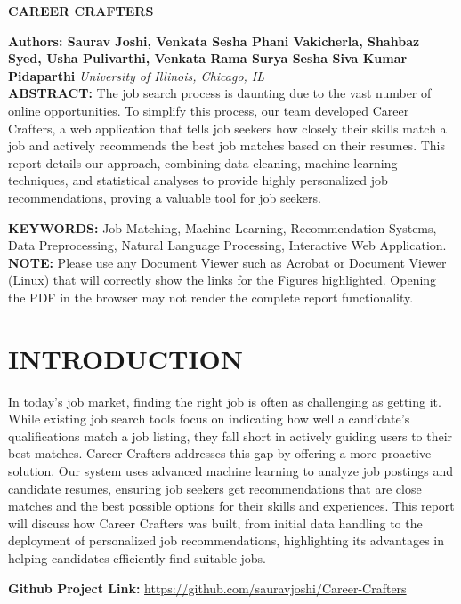 \documentclass[a4paper,10pt]{article}
\begin{document}
\noindent 
\begin{center}
\textbf{{\Large CAREER CRAFTERS}} \\
\end{center}

\noindent 
\textbf{Authors: Saurav Joshi, Venkata Sesha Phani Vakicherla, Shahbaz Syed, Usha Pulivarthi, Venkata Rama Surya Sesha Siva Kumar Pidaparthi} \textit{University of Illinois, Chicago, IL}
\\

\noindent 
\textbf{ABSTRACT: } The job search process is daunting due to the vast number of online opportunities. To simplify this process, our team developed Career Crafters, a web application that tells job seekers how closely their skills match a job and actively recommends the best job matches based on their resumes. This report details our approach, combining data cleaning, machine learning techniques, and statistical analyses to provide highly personalized job recommendations, proving a valuable tool for job seekers.

\noindent 
\textbf{KEYWORDS:} Job Matching, Machine Learning, Recommendation Systems, Data Preprocessing, Natural Language Processing, Interactive Web Application. \\
\noindent 
\textbf{NOTE:} Please use any Document Viewer such as Acrobat or Document Viewer (Linux) that will correctly show the links for the Figures highlighted. Opening the PDF in the browser may not render the complete report functionality. 
\section{INTRODUCTION}

In today’s job market, finding the right job is often as challenging as getting it. While existing job search tools focus on indicating how well a candidate's qualifications match a job listing, they fall short in actively guiding users to their best matches. Career Crafters addresses this gap by offering a more proactive solution. Our system uses advanced machine learning to analyze job postings and candidate resumes, ensuring job seekers get recommendations that are close matches and the best possible options for their skills and experiences. This report will discuss how Career Crafters was built, from initial data handling to the deployment of personalized job recommendations, highlighting its advantages in helping candidates efficiently find suitable jobs.

\textbf{Github Project Link: } \hyperlink{https://github.com/sauravjoshi/Career-Crafters}{https://github.com/sauravjoshi/Career-Crafters}
\end{document}
